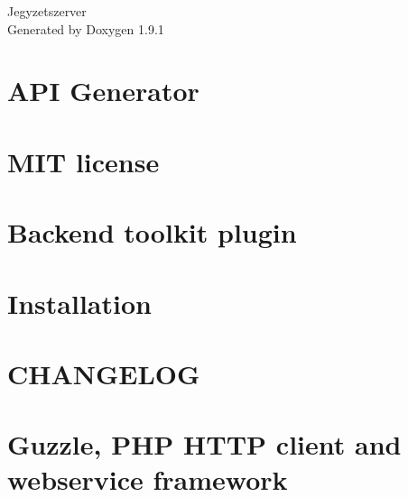 \let\mypdfximage\pdfximage\def\pdfximage{\immediate\mypdfximage}\documentclass[twoside]{book}
\newcommand{\+}{\discretionary{\mbox{\scriptsize$\hookleftarrow$}}{}{}}
\newcommand{\clearemptydoublepage}{%
  \newpage{\pagestyle{empty}\cleardoublepage}%
}
\begin{document}
\raggedbottom

\hypersetup{pageanchor=false,
             bookmarksnumbered=true,
             pdfencoding=unicode
            }
\begin{titlepage}
\vspace*{7cm}
\begin{center}%
{\Large Jegyzetszerver }\\
\vspace*{1cm}
{\large Generated by Doxygen 1.9.1}\\
\end{center}
\end{titlepage}
\clearemptydoublepage
{}
\tableofcontents
\clearemptydoublepage
{}
\hypersetup{pageanchor=true}

\chapter{API Generator}
\label{md_ahmadfatoni_apigenerator__readme}

\chapter{MIT license}
\label{md_indikator_backend__l_i_c_e_n_c_e}

\chapter{Backend toolkit plugin}
\label{md_indikator_backend__r_e_a_d_m_e}

\chapter{Installation}
\label{md_pixel_shop_setup}

\chapter{CHANGELOG}
\label{md_pixel_shop_vendor_guzzle_guzzle__c_h_a_n_g_e_l_o_g}

\chapter{Guzzle, PHP HTTP client and webservice framework}
\label{md_pixel_shop_vendor_guzzle_guzzle__r_e_a_d_m_e}

\end{document}
